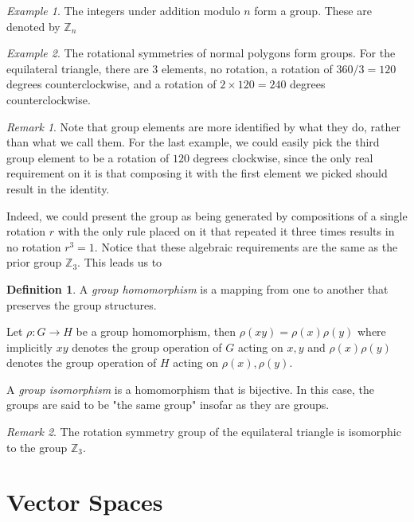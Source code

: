 \documentclass[12pt]{article}
\theoremstyle{definition}
\newtheorem{definition}{Definition}[section]
\theoremstyle{remark}
\newtheorem*{remark}{Remark}
\theoremstyle{example}
\newtheorem{example}{Example}
\begin{document}
\begin{example}
	The integers under addition modulo $n$ form a group. These are denoted by $\mathbb{Z}_n$
\end{example}

\begin{example}
	The rotational symmetries of normal polygons form groups. For the equilateral triangle, there are $3$ elements, no rotation, a rotation of $360/3=120$ degrees counterclockwise, and a rotation of $2\times 120=240$ degrees counterclockwise.
\end{example}
\begin{remark}
	Note that group elements are more identified by what they do, rather than what we call them. For the last example, we could easily pick the third group element to be a rotation of $120$ degrees clockwise, since the only real requirement on it is that composing it with the first element we picked should result in the identity.
	
	Indeed, we could present the group as being generated by compositions of a single rotation $r$ with the only rule placed on it that repeated it three times results in no rotation $r^3 = 1$. Notice that these algebraic requirements are the same as the prior group $\mathbb{Z}_3$. This leads us to
\end{remark}

\begin{definition}
	A \textit{group homomorphism} is a mapping from one to another that preserves the group structures.
	
	Let $\rho:G\to H$ be a group homomorphism, then $\rho(xy)=\rho(x)\rho(y)$ where implicitly $xy$ denotes the group operation of $G$ acting on $x,y$ and $\rho(x)\rho(y)$ denotes the group operation of $H$ acting on $\rho(x),\rho(y)$.
	
	A \textit{group isomorphism} is a homomorphism that is bijective. In this case, the groups are said to be "the same group" insofar as they are groups.
\end{definition}

\begin{remark}
	The rotation symmetry group of the equilateral triangle is isomorphic to the group $\mathbb{Z}_3$.
\end{remark}

\section{Vector Spaces}
\end{document}
